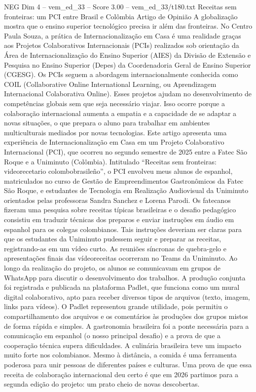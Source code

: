 \begin{textsample}{NEG Dim 4 – vem\_ed\_33 – Score 3.00 – vem\_ed\_33/t180.txt}  \label{ex:f4_neg_041}
Receitas sem fronteiras: um PCI entre Brasil e Colômbia Artigo de Opinião A globalização mostra que o ensino superior tecnológico precisa ir além das fronteiras.
No Centro Paula Souza, a prática de Internacionalização em Casa é uma realidade graças aos Projetos Colaborativos Internacionais (PCIs) realizados sob orientação da Área de Internacionalização do Ensino Superior (AIES) da Divisão de Extensão e Pesquisa no Ensino Superior (Depes) da Coordenadoria Geral de Ensino Superior (CGESG).
Os PCIs seguem a abordagem internacionalmente conhecida como COIL (Collaborative Online International Learning, ou Aprendizagem Internacional Colaborativa Online).
Esses projetos ajudam no desenvolvimento de competências globais sem que seja necessário viajar.
Isso ocorre porque a colaboração internacional aumenta a empatia e a capacidade de se adaptar a novas situações, o que prepara o aluno para trabalhar em ambientes multiculturais mediados por novas tecnologias.
Este artigo apresenta uma experiência de Internacionalização em Casa em um Projeto Colaborativo Internacional (PCI), que ocorreu no segundo semestre de 2025 entre a Fatec São Roque e a Uniminuto (Colômbia).
Intitulado “Receitas sem fronteiras: videorecetario colombobrasileño”, o PCI envolveu meus alunos de espanhol, matriculados no curso de Gestão de Empreendimentos Gastronômicos da Fatec São Roque, e estudantes de Tecnologia em Realização Audiovisual da Uniminuto orientados pelas professoras Sandra Sanchez e Lorena Parodi.
Os fatecanos fizeram uma pesquisa sobre receitas típicas brasileiras e o desafio pedagógico consistiu em traduzir técnicas dos preparos e enviar instruções em áudio em espanhol para os colegas colombianos.
Tais instruções deveriam ser claras para que os estudantes da Uniminuto pudessem seguir e preparar as receitas, registrando-as em um vídeo curto.
As reuniões síncronas de quebra-gelo e apresentações finais das vídeoreceitas ocorreram no Teams da Uniminuto.
Ao longo da realização do projeto, os alunos se comunicavam em grupos de WhatsApp para discutir o desenvolvimento dos trabalhos.
A produção conjunta foi registrada e publicada na plataforma Padlet, que funciona como um mural digital colaborativo, apto para receber diversos tipos de arquivos (texto, imagem, links para vídeos).
O Padlet representou grande utilidade, pois permitiu o compartilhamento dos arquivos e os comentários às produções dos grupos mistos de forma rápida e simples.
A gastronomia brasileira foi a ponte necessária para a comunicação em espanhol (o nosso principal desafio) e a prova de que a cooperação técnica supera dificuldades.
A culinária brasileira teve um impacto muito forte nos colombianos.
Mesmo à distância, a comida é uma ferramenta poderosa para unir pessoas de diferentes países e culturas.
Uma prova de que essa receita de colaboração internacional deu certo é que em 2026 partimos para a segunda edição do projeto: um prato cheio de novas descobertas.

\end{textsample}
